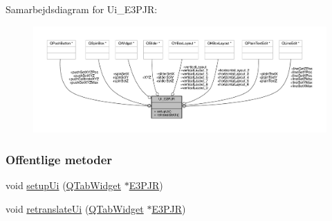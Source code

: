 Samarbejdsdiagram for Ui\+\_\+\+E3\+P\+JR\+:
\nopagebreak
\begin{figure}[H]
\begin{center}
\leavevmode
\includegraphics[width=350pt]{dd/d9a/class_ui___e3_p_j_r__coll__graph}
\end{center}
\end{figure}
\subsubsection*{Offentlige metoder}
\begin{DoxyCompactItemize}
\item 
void \hyperlink{class_ui___e3_p_j_r_acd00a207b203ce4e08e2d4fe020281d2}{setup\+Ui} (\hyperlink{class_q_tab_widget}{Q\+Tab\+Widget} $\ast$\hyperlink{class_e3_p_j_r}{E3\+P\+JR})
\item 
void \hyperlink{class_ui___e3_p_j_r_ab4d1867d3517a19d5b74c57ffd921202}{retranslate\+Ui} (\hyperlink{class_q_tab_widget}{Q\+Tab\+Widget} $\ast$\hyperlink{class_e3_p_j_r}{E3\+P\+JR})
\end{DoxyCompactItemize}
